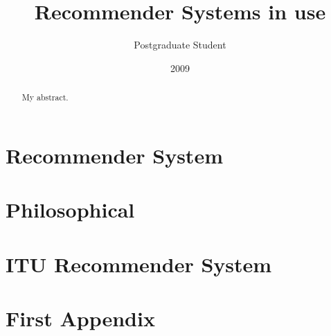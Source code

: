 \documentclass[10pt, oneside]{report}
\title{Recommender Systems in use}
\author{Postgraduate Student}
\date{2009}
\begin{document}
\newcommand\todo[1]{\textcolor{red}{#1}\PackageWarning{TODO:}{#1!}}

\maketitle


\begin{abstract}
My abstract.
\end{abstract}

\tableofcontents

\chapter{Recommender System}
\label{chap:chapter1}





\chapter{Philosophical}
\label{chap:chapter2}


\chapter{ITU Recommender System}
\label{chap:chapter3}








\chapter{First Appendix}

\end{document}
